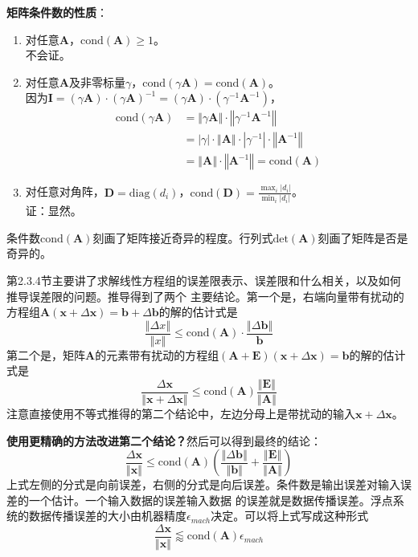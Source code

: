 \documentclass[14pt, letterpaper, UTF8, fontset=windowsnew, heading=true]{article}
\providecommand{\abs}[1]{\left\vert#1\right\vert}
\providecommand{\norm}[1]{\left\Vert#1\right\Vert}
\begin{document}
\par
\textbf{矩阵条件数的性质}：
\begin{enumerate}
	\item
	对任意$\bm{A}$，$\text{cond}(\bm{A})\geq 1$。\\
	不会证。
	\item
	对任意$\bm{A}$及非零标量$\gamma$，$\text{cond}(\gamma\bm{A})=\text{cond}(\bm{A})$。 \\
	因为$\bm{I}=(\gamma\bm{A})\cdot(\gamma\bm{A})^{-1}=(\gamma\bm{A})\cdot(\gamma^{-1}\bm{A}^{-1})$，
	$$\begin{aligned}
		\text{cond}(\gamma\bm{A}) &= \norm{\gamma\bm{A}}\cdot\norm{\gamma^{-1}\bm{A}^{-1}} \\
		&= \abs{\gamma}\cdot\norm{\bm{A}}\cdot\abs{\gamma^{-1}}\cdot\norm{\bm{A}^{-1}} \\
		&= \norm{\bm{A}}\cdot\norm{\bm{A}^{-1}} = \text{cond}(\bm{A})
	\end{aligned}$$
	\item
	对任意对角阵，$\bm{D}=\text{diag}(d_i)$，$\text{cond}(\bm{D})=\frac{\max_i\abs{d_i}}{\min_i\abs{d_i}}$。 \\
	证：显然。
\end{enumerate}
\par
条件数$\text{cond}(\bm{A})$刻画了矩阵接近奇异的程度。行列式$\text{det}(\bm{A})$刻画了矩阵是否是奇异的。

\par
第2.3.4节主要讲了求解线性方程组的误差限表示、误差限和什么相关，以及如何推导误差限的问题。推导得到了两个
主要结论。第一个是，右端向量带有扰动的方程组$\bm{A}(\bm{x}+\Delta\bm{x})=\bm{b}+\Delta\bm{b}$的解的估计式是
$$\frac{\norm{\Delta x}}{\norm{x}} \leq \text{cond}(\bm{A})\cdot \frac{\norm{\Delta \bm{b}}}{\bm{b}}$$
第二个是，矩阵$\bm{A}$的元素带有扰动的方程组$(\bm{A}+\bm{E})(\bm{x}+\Delta\bm{x})=\bm{b}$的解的估计式是
$$\frac{\Delta\bm{x}}{\norm{\bm{x}+\Delta\bm{x}}}\leq \text{cond}(\bm{A})\frac{\norm{\bm{E}}}{\norm{\bm{A}}}$$
注意直接使用不等式推得的第二个结论中，左边分母上是带扰动的输入$\bm{x}+\Delta\bm{x}$。

\par

\textbf{使用更精确的方法改进第二个结论？}然后可以得到最终的结论：
$$\frac{\Delta\bm{x}}{\norm{\bm{x}}}\leq \text{cond}(\bm{A})\left(\frac{\norm{\Delta\bm{b}}}{\norm{\bm{b}}}
+\frac{\norm{\bm{E}}}{\norm{\bm{A}}}\right)$$
上式左侧的分式是向前误差，右侧的分式是向后误差。条件数是输出误差对输入误差的一个估计。一个输入数据的误差输入数据
的误差就是数据传播误差。浮点系统的数据传播误差的大小由机器精度$\epsilon_{mach}$决定。可以将上式写成这种形式
$$\frac{\Delta\bm{x}}{\norm{\bm{x}}} \lessapprox \text{cond}(\bm{A})\epsilon_{mach}$$
\end{document}
